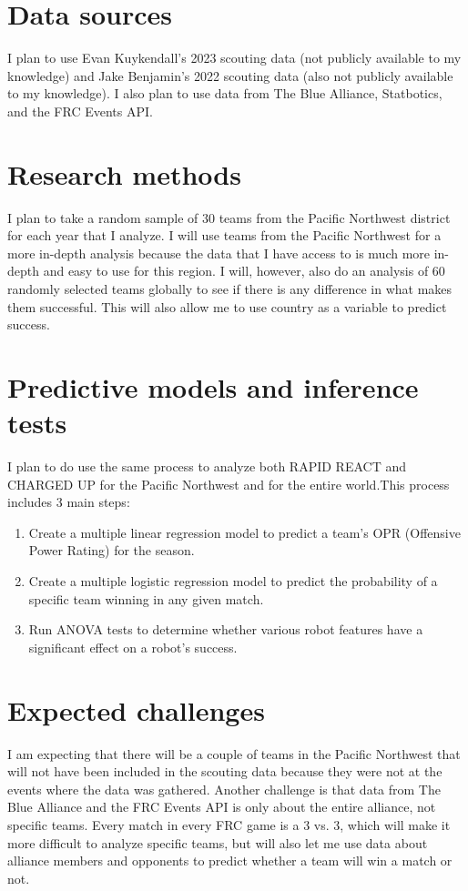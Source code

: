\documentclass[12pt, letterpaper]{article}
\begin{document}
\section{Data sources}

I plan to use Evan Kuykendall's 2023 scouting data (not publicly available to my knowledge) and Jake Benjamin's 2022
scouting data (also not publicly available to my knowledge). I also plan to use data from The Blue Alliance,
Statbotics, and the FRC Events API.\@ 

\section{Research methods}

I plan to take a random sample of 30 teams from the Pacific Northwest district for each year that I analyze. I will use
teams from the Pacific Northwest for a more in-depth analysis because the data that I have access to is much more
in-depth and easy to use for this region. I will, however, also do an analysis of 60 randomly selected teams globally
to see if there is any difference in what makes them successful. This will also allow me to use country as a variable
to predict success.

\section{Predictive models and inference tests}

I plan to do use the same process to analyze both RAPID REACT and CHARGED UP for the Pacific Northwest and for the
entire world.\@ This process includes 3 main steps:
\begin{enumerate}
    \item Create a multiple linear regression model to predict a team's OPR (Offensive Power Rating) for the season.
    \item Create a multiple logistic regression model to predict the probability of a specific team winning in any 
    given match.
    \item Run ANOVA tests to determine whether various robot features have a significant effect on a robot's success.
\end{enumerate}

\section{Expected challenges}

I am expecting that there will be a couple of teams in the Pacific Northwest that will not have been included in the
scouting data because they were not at the events where the data was gathered. Another challenge is that data from The
Blue Alliance and the FRC Events API is only about the entire alliance, not specific teams. Every match in every FRC
game is a 3 vs. 3, which will make it more difficult to analyze specific teams, but will also let me use data about
alliance members and opponents to predict whether a team will win a match or not. 
\end{document}
